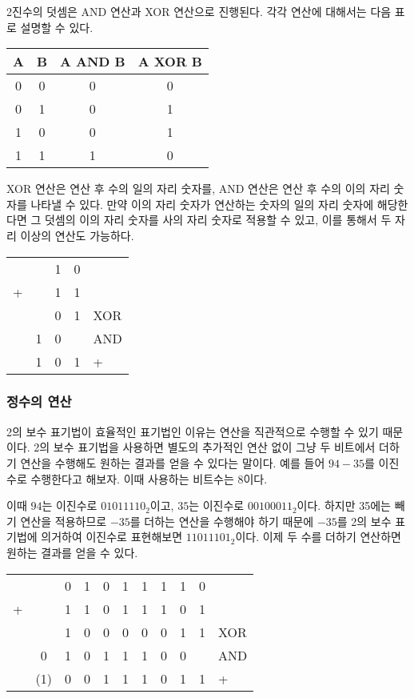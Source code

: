 \documentclass{article}
\begin{document}
2진수의 덧셈은 AND 연산과 XOR 연산으로 진행된다. 각각 연산에 대해서는 다음 표로 설명할
수 있다.

\begin{center}
    \begin{tabular}{cc|cc}
        A & B & A AND B & A XOR B \\
        \hline
        0 & 0 & 0 & 0 \\
        0 & 1 & 0 & 1 \\
        1 & 0 & 0 & 1 \\
        1 & 1 & 1 & 0
    \end{tabular}
\end{center}

XOR 연산은 연산 후 수의 일의 자리 숫자를, AND 연산은 연산 후 수의 이의 자리 숫자를 나타낼 수
있다. 만약 이의 자리 숫자가 연산하는 숫자의 일의 자리 숫자에 해당한다면 그 덧셈의 이의 자리
숫자를 사의 자리 숫자로 적용할 수 있고, 이를 통해서 두 자리 이상의 연산도 가능하다.

\begin{center}
    \begin{tabular}{ccccl}
          &   & 1 & 0 & \\
        + &   & 1 & 1 & \\
        \hline
          &   & 0 & 1 & XOR \\
          & 1 & 0 &   & AND \\
        \hline
          & 1 & 0 & 1 & +
    \end{tabular}
\end{center}

\subsubsection{정수의 연산}

2의 보수 표기법이 효율적인 표기법인 이유는 연산을 직관적으로 수행할 수 있기 때문이다.
2의 보수 표기법을 사용하면 별도의 추가적인 연산 없이 그냥 두 비트에서 더하기 연산을 수행해도
원하는 결과를 얻을 수 있다는 말이다. 예를 들어 $94 - 35$를 이진수로
수행한다고 해보자. 이때 사용하는 비트수는 8이다.

이때 $94$는 이진수로 $01011110_2$이고, $35$는 이진수로 $00100011_2$이다.
하지만 35에는 빼기 연산을 적용하므로 $-35$를 더하는 연산을 수행해야 하기 때문에
$-35$를 2의 보수 표기법에 의거하여 이진수로 표현해보면 $11011101_2$이다.
이제 두 수를 더하기 연산하면 원하는 결과를 얻을 수 있다.

\begin{center}
    \begin{tabular}{ccccccccccl}
          &   & 0 & 1 & 0 & 1 & 1 & 1 & 1 & 0 & \\
        + &   & 1 & 1 & 0 & 1 & 1 & 1 & 0 & 1 & \\
        \hline
          &   & 1 & 0 & 0 & 0 & 0 & 0 & 1 & 1 & XOR \\
          & 0 & 1 & 0 & 1 & 1 & 1 & 0 & 0 &   & AND \\
        \hline
          & (1) & 0 & 0 & 1 & 1 & 1 & 0 & 1 & 1 & +
    \end{tabular}
\end{center}
\end{document}
